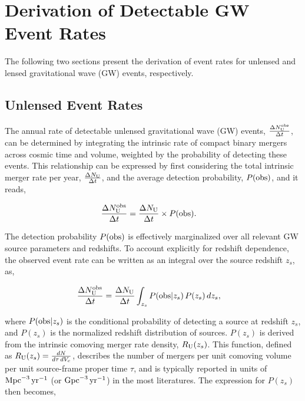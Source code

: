 \documentclass[aps,prd,twocolumn,superscriptaddress,groupedaddress,nofootinbib,showpacs,eqsecnum]{revtex4-1}
\begin{document}
\section{Derivation of Detectable GW Event Rates}\label{sec:event_rates}

The following two sections present the derivation of event rates for unlensed and lensed gravitational wave (GW) events, respectively.

\subsection{Unlensed Event Rates}\label{sec:unlensed_rates}

The annual rate of detectable unlensed gravitational wave (GW) events, $\frac{\Delta N^{\rm obs}_{\rm U}}{\Delta t}$, can be determined by integrating the intrinsic rate of compact binary mergers across cosmic time and volume, weighted by the probability of detecting these events. This relationship can be expressed by first considering the total intrinsic merger rate per year, $\frac{\Delta N_{\rm U}}{\Delta t}$, and the average detection probability, $P({\rm obs})$, and it reads,

\begin{align}
\frac{\Delta N^{\rm obs}_{\rm U}}{\Delta t} &= \frac{\Delta N_{\rm U}}{\Delta t} \times P({\rm obs}).
\label{eqn:unlensed_event_rate}
\end{align}

The detection probability $P({\rm obs})$ is effectively marginalized over all relevant GW source parameters and redshifts. To account explicitly for redshift dependence, the observed event rate can be written as an integral over the source redshift $z_s$, as,

\begin{align}
\frac{\Delta N^{\rm obs}_{\rm U}}{\Delta t} &= \frac{\Delta N_{\rm U}}{\Delta t} \int_{z_s} P({\rm obs}|z_s) \, P(z_s) \, dz_s,
\label{eqn:unlensed_event_rate_z}
\end{align}

where $P({\rm obs}|z_s)$ is the conditional probability of detecting a source at redshift $z_s$, and $P(z_s)$ is the normalized redshift distribution of sources. $P(z_s)$ is derived from the intrinsic comoving merger rate density, $R_{\rm U}(z_s)$. This function, defined as $R_{\rm U}(z_s) = \frac{dN}{d\tau \, dV_c}$, describes the number of mergers per unit comoving volume per unit source-frame proper time $\tau$, and is typically reported in units of ${\rm Mpc}^{-3}\,{\rm yr}^{-1}$ (or ${\rm Gpc}^{-3}\,{\rm yr}^{-1}$) in the most literatures. The expression for $P(z_s)$ then becomes,
\end{document}
